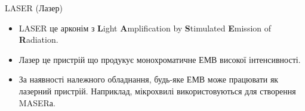 {\Large LASER (Лазер)}
\begin{itemize}

\item LASER це арконім з {\bfseries L}ight {\bfseries A}mplification by {\bfseries S}timulated {\bfseries E}mission of {\bfseries R}adiation.
\item Лазер це пристрій що продукує монохроматичне ЕМВ високої інтенсивності.
\item За наявності належного обладнання, будь-яке ЕМВ може працювати як лазерний пристрій. Наприклад, мікрохвилі використовуються для створення MASERа.


\end{itemize}
